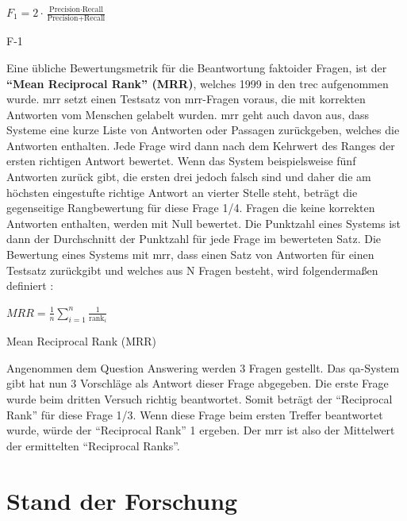 \documentclass[
        ngerman,
        paper=a4,
        numbers=noendperiod,
]{scrreprt}
\begin{document}
\begin{xequation-} 
\centering ${F_1}= 2 \cdot \frac{\text{Precision} \cdot \text{Recall}}{\text{Precision} + \text{Recall}}$
\caption[F-1]{F-1} 
    \label{eqn:FME}
\end{xequation-} 




Eine übliche Bewertungsmetrik für die Beantwortung faktoider Fragen, ist der \textbf{\enquote{Mean Reciprocal Rank} (MRR)}, welches 1999 in den \ac{trec} \citep{voorhees1999proceedings} aufgenommen wurde. \ac{mrr} setzt einen Testsatz von \ac{mrr}-Fragen voraus, die mit korrekten Antworten vom Menschen gelabelt wurden. \ac{mrr} geht auch davon aus, dass Systeme eine kurze Liste von Antworten oder Passagen zurückgeben, welches die Antworten enthalten. Jede Frage wird dann nach dem Kehrwert des Ranges der ersten richtigen Antwort bewertet. Wenn das System beispielsweise fünf Antworten zurück gibt, die ersten drei jedoch falsch sind und daher die am höchsten eingestufte richtige Antwort an vierter Stelle steht, beträgt die gegenseitige Rangbewertung für diese Frage 1/4. Fragen die keine korrekten Antworten enthalten, werden mit Null bewertet. Die Punktzahl eines Systems ist dann der Durchschnitt der Punktzahl für jede Frage im bewerteten Satz. Die Bewertung eines Systems mit \ac{mrr}, dass einen Satz von Antworten für einen Testsatz zurückgibt und welches aus N Fragen besteht, wird folgendermaßen definiert \citep [S. 483]{Jurafsky2014SpeechProcessing}:

\begin{xequation-} 
\centering ${MRR}= \frac{1}{n} \sum_{i=1}^{n} \frac{1}{\text{rank}_i}$
\caption[Mean Reciprocal Rank (MRR)]{Mean Reciprocal Rank (MRR)} 
    \label{eqn:MRR}
\end{xequation-} 

Angenommen dem Question Answering werden 3 Fragen gestellt. Das \ac{qa}-System gibt hat nun 3 Vorschläge als Antwort dieser Frage abgegeben. Die erste Frage wurde beim dritten Versuch richtig beantwortet. Somit beträgt der \enquote{Reciprocal Rank} für diese Frage 1/3. Wenn diese Frage beim ersten Treffer beantwortet wurde, würde der \enquote{Reciprocal Rank} 1 ergeben. Der \ac{mrr} ist also der Mittelwert der ermittelten \enquote{Reciprocal Ranks}.





\chapter{Stand der Forschung}
\end{document}
